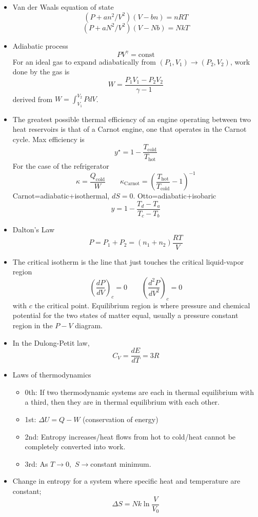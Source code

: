 \documentclass[english]{article}
\begin{document}
\begin{itemize}
\item Van der Waals equation of state\[
(P+an^{2}/V^{2})(V-bn)=nRT\]
\[
(P+aN^{2}/V^{2})(V-Nb)=NkT\]

\item Adiabatic process\[
PV^{\gamma}=\text{const}\]
For an ideal gas to expand adiabatically from $(P_{1},V_{1})\to(P_{2},V_{2})$,
work done by the gas is\[
W=\frac{P_{1}V_{1}-P_{2}V_{2}}{\gamma-1}\]
derived from $W=\int_{V_{1}}^{V_{2}}PdV$.
\item The greatest possible thermal efficiency of an engine operating between
two heat reservoirs is that of a Carnot engine, one that operates
in the Carnot cycle. Max efficiency is\[
y^{\star}=1-\frac{T_{\text{cold}}}{T_{\text{hot}}}\]
For the case of the refrigerator\[
\kappa=\frac{Q_{\text{cold}}}{W}\qquad\kappa_{\text{Carnot}}=\left(\frac{T_{\text{hot}}}{T_{\text{cold}}}-1\right)^{-1}\]
Carnot=adiabatic+isothermal, $dS=0$. Otto=adiabatic+isobaric\[
y=1-\frac{T_{d}-T_{a}}{T_{c}-T_{b}}\]

\item Dalton's Law\[
P=P_{1}+P_{2}=(n_{1}+n_{2})\frac{RT}{V}\]

\item The critical isotherm is the line that just touches the critical liquid-vapor
region\[
\left(\frac{dP}{dV}\right)_{c}=0\qquad\left(\frac{d^{2}P}{dV^{2}}\right)_{c}=0\]
with $c$ the critical point. Equilibrium region is where pressure
and chemical potential for the two states of matter equal, usually
a pressure constant region in the $P-V$ diagram.
\item In the Dulong-Petit law,\[
C_{V}=\frac{dE}{dT}=3R\]

\item Laws of thermodynamics

\begin{itemize}
\item 0th: If two thermodynamic systems are each in thermal equilibrium
with a third, then they are in thermal equilibrium with each other.
\item 1st: $\Delta U=Q-W$ (conservation of energy)
\item 2nd: Entropy increases/heat flows from hot to cold/heat cannot be
completely converted into work.
\item 3rd: As $T\to0,$ $S\to$constant minimum.
\end{itemize}
\item Change in entropy for a system where specific heat and temperature
are constant;\[
\Delta S=Nk\ln\frac{V}{V_{0}}\]


\end{itemize}
\end{document}
